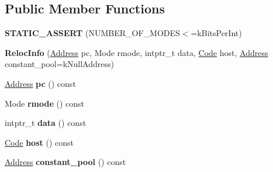 \subsection*{Public Member Functions}
\begin{DoxyCompactItemize}
\item 
\mbox{\label{classv8_1_1internal_1_1RelocInfo_a0d452667cd0ee0eb944f7ee7cc9b7dea}} 
{\bfseries S\+T\+A\+T\+I\+C\+\_\+\+A\+S\+S\+E\+RT} (N\+U\+M\+B\+E\+R\+\_\+\+O\+F\+\_\+\+M\+O\+D\+ES$<$=k\+Bits\+Per\+Int)
\item 
\mbox{\label{classv8_1_1internal_1_1RelocInfo_a456992820657fdfa8fba3db076773e9f}} 
{\bfseries Reloc\+Info} (\mbox{\hyperlink{classuintptr__t}{Address}} pc, Mode rmode, intptr\+\_\+t data, \mbox{\hyperlink{classv8_1_1internal_1_1Code}{Code}} host, \mbox{\hyperlink{classuintptr__t}{Address}} constant\+\_\+pool=k\+Null\+Address)
\item 
\mbox{\label{classv8_1_1internal_1_1RelocInfo_ae4e4b6b325ffcbba5c03de7c640c8f99}} 
\mbox{\hyperlink{classuintptr__t}{Address}} {\bfseries pc} () const
\item 
\mbox{\label{classv8_1_1internal_1_1RelocInfo_adbcb85c0a1896ff1e7661746d6143e90}} 
Mode {\bfseries rmode} () const
\item 
\mbox{\label{classv8_1_1internal_1_1RelocInfo_ad66d51d2cd4ceaa7c5e9fc6adc69c4de}} 
intptr\+\_\+t {\bfseries data} () const
\item 
\mbox{\label{classv8_1_1internal_1_1RelocInfo_a691844e190ac36795d08e805187054f2}} 
\mbox{\hyperlink{classv8_1_1internal_1_1Code}{Code}} {\bfseries host} () const
\item 
\mbox{\label{classv8_1_1internal_1_1RelocInfo_aa4314d13f013efd9affcd17fbab1f4f2}} 
\mbox{\hyperlink{classuintptr__t}{Address}} {\bfseries constant\+\_\+pool} () const
\item 
\mbox{\label{classv8_1_1internal_1_1RelocInfo_a2f9c0cf5d56324fe127b8cccbaa2de78}} 

\end{DoxyCompactItemize}
